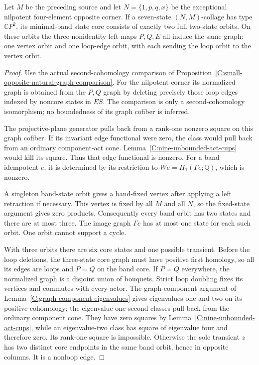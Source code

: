 \begin{lemma}
\label{C:six-four-seven-core-pattern}
Let $M$ be the preceding source and let
$N=\{1,p,q,x\}$ be the exceptional nilpotent four-element
opposite corner.  If a seven-state $(N,M)$-collage has
type $\mathbb CP^2$, its minimal-band state core consists
of exactly two full two-state orbits.  On these orbits
the three nonidentity left maps $P,Q,E$ all induce the
same graph: one vertex orbit and one loop-edge orbit,
with each sending the loop orbit to the vertex orbit.
\end{lemma}
\begin{proof}
Use the actual second-cohomology comparison of
Proposition~\ref{C:small-opposite-natural-graph-comparison}.
For the nilpotent corner its normalized graph is obtained
from the $P,Q$ graph by deleting precisely those loop
edges indexed by noncore states in $ES$.
The comparison is only a second-cohomology isomorphism;
no boundedness of its graph cofiber is inferred.

The projective-plane generator pulls back from a
rank-one nonzero square on this graph cofiber.
If its invariant edge functional were zero, the class
would pull back from an ordinary component-act cone.
Lemma~\ref{C:nine-unbounded-act-cups} would kill its square.
Thus that edge functional is nonzero.  For a band
idempotent $e$, it is determined by its restriction
to $We=H_1(\Gamma e;\mathbb Q)$, which is nonzero.

A singleton band-state orbit gives a band-fixed vertex
after applying a left retraction if necessary.  This
vertex is fixed by all $M$ and all $N$, so the fixed-state
argument gives zero products.  Consequently every band
orbit has two states and there are at most three.
The image graph $\Gamma e$ has at most one state for
each such orbit.  One orbit cannot support a cycle.

With three orbits there are six core states and one
possible transient.  Before the loop deletions, the
three-state core graph must have positive first homology,
so all its edges are loops and $P=Q$ on the band core.
If $P=Q$ everywhere, the normalized graph is a disjoint
union of bouquets.  Strict loop doubling fixes its
vertices and commutes with every actor.  The graph-component
argument of Lemma~\ref{C:graph-component-eigenvalues}
gives eigenvalues one and two on its positive cohomology;
the eigenvalue-one second classes pull back from the
ordinary component cone.  They have zero squares by
Lemma~\ref{C:nine-unbounded-act-cups}, while an
eigenvalue-two class has square of eigenvalue four
and therefore zero.  Its rank-one square is impossible.
Otherwise the sole transient $z$ has two distinct
core endpoints in the same band orbit, hence in
opposite columns.  It is a nonloop edge.


\end{proof}
